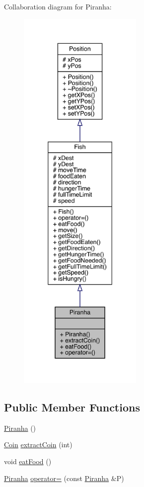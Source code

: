 Collaboration diagram for Piranha\+:
\nopagebreak
\begin{figure}[H]
\begin{center}
\leavevmode
\includegraphics[height=550pt]{class_piranha__coll__graph}
\end{center}
\end{figure}
\subsection*{Public Member Functions}
\begin{DoxyCompactItemize}
\item 
\mbox{\hyperlink{class_piranha_a7e3a4c5c7f458c16717c8cb997fc0331}{Piranha}} ()
\item 
\mbox{\hyperlink{class_coin}{Coin}} \mbox{\hyperlink{class_piranha_aed1eb8799f7b92fbfb47fd760bf31cbf}{extract\+Coin}} (int)
\item 
void \mbox{\hyperlink{class_piranha_a50992b83e072f8719150d302469a462f}{eat\+Food}} ()
\item 
\mbox{\hyperlink{class_piranha}{Piranha}} \mbox{\hyperlink{class_piranha_a3f3a74ccd3e74052a78134c597fa6827}{operator=}} (const \mbox{\hyperlink{class_piranha}{Piranha}} \&P)
\end{DoxyCompactItemize}
